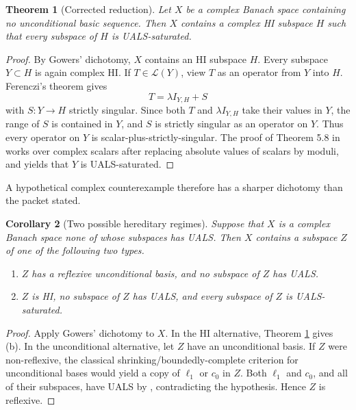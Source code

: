 \documentclass[11pt]{article}
\newtheorem{theorem}{Theorem}[section]
\newtheorem{corollary}[theorem]{Corollary}
\theoremstyle{definition}
\theoremstyle{remark}
\newcommand{\LL}{\mathcal{L}}
\begin{document}
\begin{theorem}[Corrected reduction]\label{thm:corrected}
Let $X$ be a complex Banach space containing no unconditional basic sequence.  Then $X$ contains a complex HI subspace $H$ such that every subspace of $H$ is UALS-saturated.
\end{theorem}

\begin{proof}
By Gowers' dichotomy, $X$ contains an HI subspace $H$.  Every subspace $Y\subset H$ is again complex HI.  If $T\in\LL(Y)$, view $T$ as an operator from $Y$ into $H$.  Ferenczi's theorem gives
\[
  T=\lambda I_{Y,H}+S
\]
with $S:Y\to H$ strictly singular.  Since both $T$ and $\lambda I_{Y,H}$ take their values in $Y$, the range of $S$ is contained in $Y$, and $S$ is strictly singular as an operator on $Y$.  Thus every operator on $Y$ is scalar-plus-strictly-singular.  The proof of Theorem 5.8 in \cite{AGLM} works over complex scalars after replacing absolute values of scalars by moduli, and yields that $Y$ is UALS-saturated.
\end{proof}

A hypothetical complex counterexample therefore has a sharper dichotomy than the packet stated.

\begin{corollary}[Two possible hereditary regimes]\label{cor:two-regimes}
Suppose that $X$ is a complex Banach space none of whose subspaces has UALS.  Then $X$ contains a subspace $Z$ of one of the following two types.
\begin{enumerate}[label=(\alph*),leftmargin=2.2em]
\item $Z$ has a reflexive unconditional basis, and no subspace of $Z$ has UALS.
\item $Z$ is HI, no subspace of $Z$ has UALS, and every subspace of $Z$ is UALS-saturated.
\end{enumerate}
\end{corollary}

\begin{proof}
Apply Gowers' dichotomy to $X$.  In the HI alternative, Theorem \ref{thm:corrected} gives (b).  In the unconditional alternative, let $Z$ have an unconditional basis.  If $Z$ were non-reflexive, the classical shrinking/boundedly-complete criterion for unconditional bases would yield a copy of $\ell_1$ or $c_0$ in $Z$.  Both $\ell_1$ and $c_0$, and all of their subspaces, have UALS by \cite[Corollary 5.13]{AGLM}, contradicting the hypothesis.  Hence $Z$ is reflexive.
\end{proof}
\end{document}
